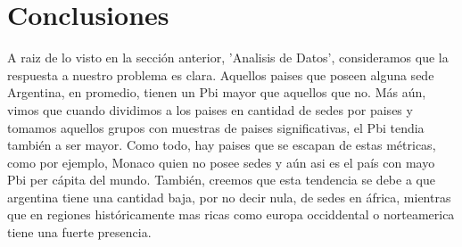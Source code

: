\documentclass[10pt,a4paper]{article}
\begin{document}
\section{Conclusiones} \vspace{0.3cm}

A raiz de lo visto en la sección anterior, 'Analisis de Datos', consideramos que la respuesta a nuestro problema es clara. Aquellos paises que poseen alguna sede Argentina, en promedio, tienen un Pbi mayor que aquellos que no. Más aún, vimos que cuando dividimos a los paises en cantidad de sedes por paises y tomamos aquellos grupos con muestras de paises significativas, el Pbi tendia también a ser mayor. Como todo, hay paises que se escapan de estas métricas, como por ejemplo, Monaco quien no posee sedes y aún asi es el país con mayo Pbi per cápita del mundo. También, creemos que esta tendencia se debe a que argentina tiene una cantidad baja, por no decir nula, de sedes en áfrica, mientras que en regiones históricamente mas ricas como europa occiddental o norteamerica tiene una fuerte presencia.
\end{document}
